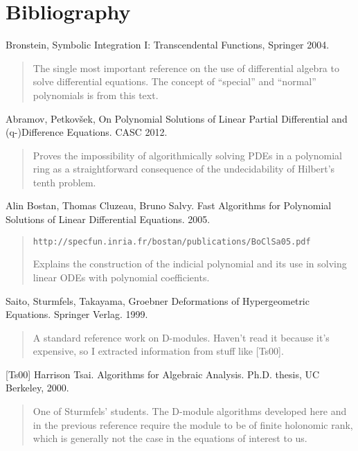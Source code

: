 \documentclass{article}
\begin{document}
\vfill\eject

\section*{Bibliography}

Bronstein, Symbolic Integration I: Transcendental Functions, Springer 2004.

\begin{quote}
The single most important reference on the use of differential
algebra to solve differential equations.  The concept of
``special'' and ``normal'' polynomials is from this text.
\end{quote}

Abramov, Petkov\v sek,
On Polynomial Solutions of Linear Partial
Differential and (q-)Difference Equations.  CASC 2012.

\begin{quote}
Proves the impossibility of algorithmically solving PDEs in a polynomial
ring as a straightforward consequence of the undecidability
of Hilbert's tenth problem.
\end{quote}

Alin Bostan, Thomas Cluzeau, Bruno Salvy.
Fast Algorithms for Polynomial Solutions
of Linear Differential Equations. 2005.

\begin{quote}
{\tt http://specfun.inria.fr/bostan/publications/BoClSa05.pdf}

Explains the construction of the indicial polynomial and its
use in solving linear ODEs with polynomial coefficients.
\end{quote}

Saito, Sturmfels, Takayama, Groebner Deformations of Hypergeometric Equations.
Springer Verlag. 1999.

\begin{quote}
A standard reference work on D-modules.  Haven't read it because it's
expensive, so I extracted information from stuff like [Ts00].
\end{quote}

[Ts00] Harrison Tsai.  Algorithms for Algebraic Analysis.  Ph.D. thesis, UC Berkeley, 2000.

\begin{quote}
One of Sturmfels' students.  The D-module algorithms developed here
and in the previous reference require the module to be of finite
holonomic rank, which is generally not the case in the equations
of interest to us.
\end{quote}
\end{document}
